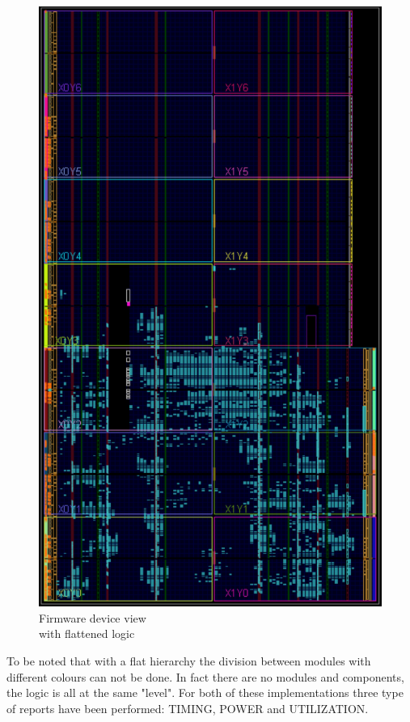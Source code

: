 \begin{figure}[H]
\begin{minipage}{.5\textwidth}
		\includegraphics[width=.85\linewidth]{IMG/ch4/FirmwareFLAT/DEVICE}
		\caption{Firmware device view \\with flattened logic}
		\label{fig:flatdevice}
	\end{minipage}
\end{figure}
\noindent To be noted that with a flat hierarchy the division between modules with different colours can not be done. In fact there are no modules and components, the logic is all at the same "level".
For both of these implementations three type of reports have been performed: TIMING, POWER and UTILIZATION.

